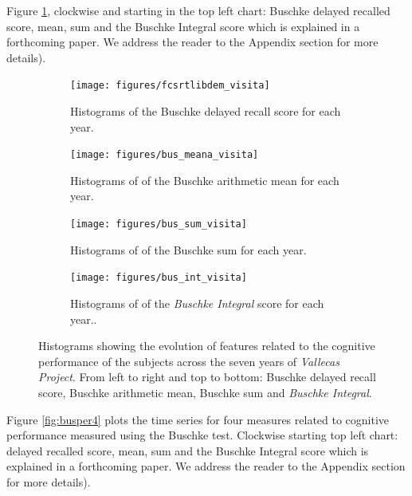 \documentclass[11pt]{article}
\theoremstyle{definition}
\theoremstyle{remark}
\begin{document}
Figure \ref{fig:cogperyearsbus}, clockwise and starting in the top left chart: Buschke delayed recalled score, mean, sum and the Buschke Integral score which is explained in a forthcoming paper. We address the reader to the Appendix section for more details).

\begin{figure}[H]
    \centering
    \begin{subfigure}[t]{0.4\textwidth}
        \centering
        \texttt{[image: figures/fcsrtlibdem\_visita]}
        \caption{Histograms of the Buschke delayed recall score for each year.}
    \end{subfigure}
    \hfill
    \begin{subfigure}[t]{0.4\textwidth}
        \centering
        \texttt{[image: figures/bus\_meana\_visita]}
        \caption{Histograms of of the Buschke arithmetic mean for each year.}
    \end{subfigure}%
    
     \begin{subfigure}[t]{0.4\textwidth}
        \centering
        \texttt{[image: figures/bus\_sum\_visita]}
        \caption{Histograms of of the Buschke sum for each year.}
    \end{subfigure}
    \hfill
    \begin{subfigure}[t]{0.4\textwidth}
        \centering
        \texttt{[image: figures/bus\_int\_visita]}
        \caption{Histograms of of the \emph{Buschke Integral} score for each year..}
    \end{subfigure}%
   
    \caption{Histograms showing the evolution of features related to the cognitive performance of the subjects across the seven years of \emph{Vallecas Project}. From left to right and top to bottom: 
    Buschke delayed recall score, Buschke arithmetic mean, Buschke sum and \emph{Buschke Integral}.}
    \label{fig:cogperyearsbus}
\end{figure}

Figure \ref{fig:busper4} plots the time series for four measures related to cognitive performance measured using the Buschke test. Clockwise starting top left chart: delayed recalled score, mean, sum and the Buschke Integral score which is explained in a forthcoming paper. We address the reader to the Appendix section for more details).
\end{document}

